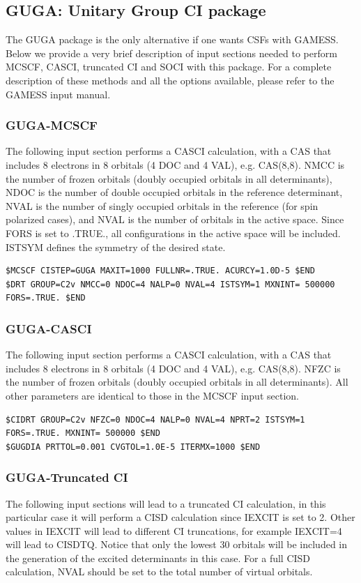 \subsection{GUGA: Unitary Group CI package}
The GUGA package is the only alternative if one wants CSFs with GAMESS. Below
we provide a very brief description of input sections needed to perform MCSCF, CASCI,
truncated CI and SOCI with this package. For a complete description of these methods and
all the options available, please refer to the GAMESS input manual.

\subsubsection{GUGA-MCSCF}
The following input section performs a CASCI calculation, with a CAS that includes 8
electrons in 8 orbitals (4 DOC and 4 VAL), e.g. CAS(8,8). NMCC is the number of frozen
orbitals (doubly occupied orbitals in all determinants), NDOC is the number of double
occupied orbitals in the reference determinant, NVAL is the number of singly occupied
orbitals in the reference (for spin polarized cases), and NVAL is the number of orbitals in
the active space. Since FORS is set to .TRUE., all configurations in the active space will
be included. ISTSYM defines the symmetry of the desired state.

\begin{lstlisting}
$MCSCF CISTEP=GUGA MAXIT=1000 FULLNR=.TRUE. ACURCY=1.0D-5 $END
$DRT GROUP=C2v NMCC=0 NDOC=4 NALP=0 NVAL=4 ISTSYM=1 MXNINT= 500000 FORS=.TRUE. $END
\end{lstlisting}

\subsubsection{GUGA-CASCI}
The following input section performs a CASCI calculation, with a CAS that includes 8
electrons in 8 orbitals (4 DOC and 4 VAL), e.g. CAS(8,8). NFZC is the number of frozen
orbitals (doubly occupied orbitals in all determinants). All other parameters are identical
to those in the MCSCF input section.

\begin{lstlisting}
$CIDRT GROUP=C2v NFZC=0 NDOC=4 NALP=0 NVAL=4 NPRT=2 ISTSYM=1 FORS=.TRUE. MXNINT= 500000 $END
$GUGDIA PRTTOL=0.001 CVGTOL=1.0E-5 ITERMX=1000 $END
\end{lstlisting}

\subsubsection{GUGA-Truncated CI}
The following input sections will lead to a truncated CI calculation, in this particular case
it will perform a CISD calculation since IEXCIT is set to 2. Other values in IEXCIT will lead
to different CI truncations, for example IEXCIT=4 will lead to CISDTQ. Notice that only
the lowest 30 orbitals will be included in the generation of the excited determinants in this
case. For a full CISD calculation, NVAL should be set to the total number of virtual orbitals.

